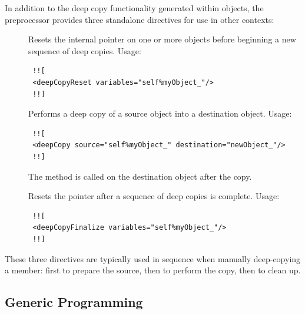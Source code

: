 In addition to the deep copy functionality generated within  objects, the preprocessor provides three standalone directives for use in other contexts:

\begin{description}
\item[] Resets the internal  pointer on one or more  objects before beginning a new sequence of deep copies. Usage:
\begin{verbatim}
 !![
 <deepCopyReset variables="self%myObject_"/>
 !!]
\end{verbatim}
\item[] Performs a deep copy of a source  object into a destination object. Usage:
\begin{verbatim}
 !![
 <deepCopy source="self%myObject_" destination="newObject_"/>
 !!]
\end{verbatim}
The  method is called on the destination object after the copy.
\item[] Resets the  pointer after a sequence of deep copies is complete. Usage:
\begin{verbatim}
 !![
 <deepCopyFinalize variables="self%myObject_"/>
 !!]
\end{verbatim}
\end{description}

These three directives are typically used in sequence when manually deep-copying a  member: first  to prepare the source, then  to perform the copy, then  to clean up.

\subsection{Generic Programming}

